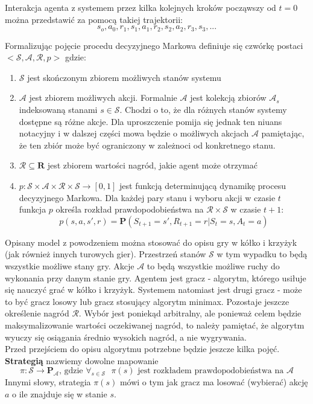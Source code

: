 \documentclass[licencjacka]{pracamgr}
\begin{document}
 Interakcja agenta z systemem przez kilka kolejnych kroków począwszy od $t=0$ można przedstawić za pomocą takiej trajektorii:
$$s_{o}, a_{0}, r_{1}, s_{1}, a_{1}, r_{2}, s_{2}, a_{2}, r_{3}, s_{3},...$$

Formalizując pojęcie procedu decyzyjnego Markowa definiuje się czwórkę postaci $<\mathcal{S},\mathcal{A},\mathcal{R},p>$ gdzie:
\begin{enumerate}
 	\item{$\mathcal{S}$ jest skończonym zbiorem możliwych stanów systemu}
	\item{$\mathcal{A}$ jest zbiorem możliwych akcji. Formalnie $\mathcal{A}$ jest kolekcją zbiorów $\mathcal{A}_{s}$ indeksowaną stanami $s\in\mathcal{S}$. Chodzi o to, że dla różnych stanów systemy dostępne są różne akcje.  Dla uproszczenie pomija się jednak  ten niuans notacyjny i w dalszej części mowa będzie o możliwych akcjach $\mathcal{A}$  pamiętając, że ten zbiór może być ograniczony w zależnoci od konkretnego stanu.}
	\item{$\mathcal{R}\subseteq\mathbf{R}$ jest zbiorem wartości nagród, jakie agent może otrzymać}
	\item{$p:\mathcal{S}\times\mathcal{A}\times\mathcal{R}\times\mathcal{S}\rightarrow [0,1]$ jest funkcją determinującą dynamikę procesu decyzyjnego Markowa. Dla każdej pary stanu i wyboru akcji w czasie $t$ funkcja $p$ określa rozkład prawdopodobieństwa na $\mathcal{R}\times\mathcal{S}$ w czasie $t+1$:  $$p(s, a, s', r) = \mathbf{P}(S_{t+1}=s', R_{t+1}=r | S_{t}=s, A_{t}=a )$$}
\end{enumerate}

Opisany model z powodzeniem można stosować do opisu gry w kółko i krzyżyk (jak również innych turowych gier). Przestrzeń stanów $\mathcal{S}$ w tym wypadku to będą wszystkie możliwe stany gry. Akcje $\mathcal{A}$ to będą wszystkie możliwe ruchy do wykonania przy danym stanie gry. Agentem jest gracz - algorytm, którego usiłuje się nauczyć grać w kółko i krzyżyk. Systemem natomiast jest drugi gracz - może to być gracz losowy lub gracz stosujący algorytm minimax. Pozostaje jeszcze określenie nagród $\mathcal{R}$. Wybór jest poniekąd arbitralny, ale ponieważ celem będzie maksymalizowanie wartości oczekiwanej nagród, to należy pamiętać, że algorytm wyuczy się osiągania średnio wysokich nagród, a nie wygrywania. \\

Przed przejściem do opisu algorytmu potrzebne będzie jeszcze kilka pojęć. \textbf{Strategią} nazwiemy dowolne mapowanie 
$$\pi : \mathcal{S}\rightarrow\mathbf{P}_{\mathcal{A}} \text{, gdzie } \forall_{s\in\mathcal{S}} \text{ } \pi(s) \text {  jest rozkładem prawdopodobieństwa na } \mathcal{A}$$ 
Innymi słowy, strategia $\pi(s)$ mówi o tym jak gracz ma losować (wybierać) akcję $a$ o ile znajduje się w stanie $s$.\\
\end{document}
